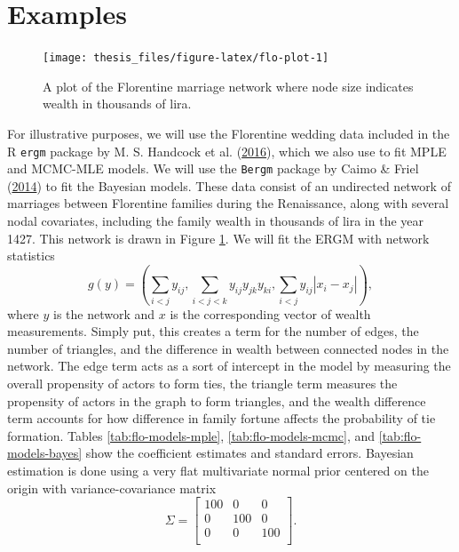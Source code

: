 \documentclass[12pt,twoside]{reedthesis}
\theoremstyle{definition}
\theoremstyle{definition}
\theoremstyle{remark}
\begin{document}
\section{Examples}\label{examples}
\begin{figure}

{\centering \texttt{[image: thesis\_files/figure-latex/flo-plot-1]} 

}

\caption{A plot of the Florentine marriage network where node size indicates wealth in thousands of lira.}\label{fig:flo-plot}
\end{figure}
For illustrative purposes, we will use the Florentine wedding data
included in the R \texttt{ergm} package by M. S. Handcock et al.
(\protect\hyperlink{ref-Handcock2016a}{2016}), which we also use to fit
MPLE and MCMC-MLE models. We will use the \texttt{Bergm} package by
Caimo \& Friel (\protect\hyperlink{ref-Caimo2014}{2014}) to fit the
Bayesian models. These data consist of an undirected network of
marriages between Florentine families during the Renaissance, along with
several nodal covariates, including the family wealth in thousands of
lira in the year 1427. This network is drawn in Figure
\ref{fig:flo-plot}. We will fit the ERGM with network statistics
\begin{equation}
g(y) = \left( \sum_{i < j} y_{ij}, \sum_{i < j < k} y_{ij} y_{jk} y_{ki}, \sum_{i < j} y_{ij} \left| x_{i} - x_{j} \right| \right),
\label{eq:flo-model}
\end{equation}
where \(y\) is the network and \(x\) is the corresponding vector of
wealth measurements. Simply put, this creates a term for the number of
edges, the number of triangles, and the difference in wealth between
connected nodes in the network. The edge term acts as a sort of
intercept in the model by measuring the overall propensity of actors to
form ties, the triangle term measures the propensity of actors in the
graph to form triangles, and the wealth difference term accounts for how
difference in family fortune affects the probability of tie formation.
Tables \ref{tab:flo-models-mple}, \ref{tab:flo-models-mcmc}, and
\ref{tab:flo-models-bayes} show the coefficient estimates and standard
errors. Bayesian estimation is done using a very flat multivariate
normal prior centered on the origin with variance-covariance matrix
\begin{equation*}
\Sigma = 
\begin{bmatrix}
100 & 0 & 0 \\
0 & 100 & 0 \\
0 & 0 & 100 \\
\end{bmatrix}.
\end{equation*}
\end{document}
